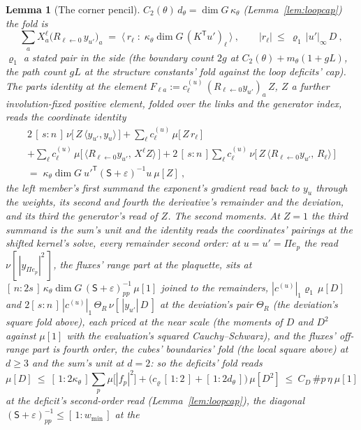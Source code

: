 \documentclass[11pt]{article}
\newtheorem{lemma}{Lemma}
\theoremstyle{definition}
\begin{document}
\begin{lemma}[The corner pencil]
$C_2(\theta)\,d_\theta=\dim G\,\kappa_\theta$ (Lemma~\ref{lem:loopcap})
the fold is
\[
\sum_aX^{\ell}_a\big(R_{\ell\leftarrow0}\,y_{u'}\big)_a
\;=\;\big\langle\,r_\ell\;:\;\kappa_\theta\dim G\,(K^{\mathsf T}u')_\ell\,\big\rangle\ ,
\qquad
|r_\ell|\ \le\ \varrho_1\,|u'|_\infty\,D\ ,
\]
$\varrho_1$ a stated pair in the side (the boundary count $2g$ at
$C_2(\theta)+m_\theta(1+gL)$, the path count $gL$ at the structure
constants' fold against the loop deficits' cap). The parts identity
at the element $F_{\ell a}:=c^{(u)}_\ell\,(R_{\ell\leftarrow0}y_{u'})_a\,Z$,
$Z$ a further involution-fixed positive element, folded over the links and
the generator index, reads the \emph{coordinate identity}
\begin{multline*}
2\,[\,s:n\,]\,\nu\big[\,Z\,\langle y_{u'},y_u\rangle\,\big]
+\sum_\ell c^{(u)}_\ell\,\mu\big[\,Z\,r_\ell\,\big]\\
+\sum_\ell c^{(u)}_\ell\,\mu\big[\,\langle R_{\ell\leftarrow0}y_{u'},\,X^{\ell}Z\rangle\,\big]
+2\,[\,s:n\,]\sum_\ell c^{(u)}_\ell\,
\nu\big[\,Z\,\langle R_{\ell\leftarrow0}y_{u'},\,R_\ell\rangle\,\big]\\
=\;\kappa_\theta\dim G\ u'^{\mathsf T}(\mathsf S+\varepsilon)^{-1}u\ \mu[Z]\ ,
\end{multline*}
the left member's first summand the exponent's gradient read back
to $y_u$ through the weights, its second and fourth the derivative's
remainder and the deviation, and its third the generator's read of
$Z$. \emph{The second moments.} At $Z=1$ the third summand is the
sum's unit and the identity reads the coordinates' pairings at the
shifted kernel's solve, every remainder second order: at
$u=u'=\Pi e_p$ the read $\nu[\,|y_{\Pi e_p}|^{2}\,]$, the fluxes'
range part at the plaquette, sits at
$[\,n:2s\,]\,\kappa_\theta\dim G\,(\mathsf S+\varepsilon)^{-1}_{pp}\,\mu[1]$
joined to the remainders, $|c^{(u)}|_1\varrho_1\,\mu[D]$ and
$2[\,s:n\,]\,|c^{(u)}|_1\,\Theta_R\,\nu[\,|y_{u'}|\,D\,]$ at the
deviation's pair $\Theta_R$ (the deviation's square fold above),
each priced at the near scale (the moments of $D$ and $D^{2}$
against $\mu[1]$ with the evaluation's squared Cauchy--Schwarz),
and the fluxes' off-range part is fourth order, the cubes'
boundaries' fold (the local square above) at $d\ge3$ and the sum's
unit at $d=2$: so the deficits' fold reads
\[
\mu[D]\ \le\ [\,1:2\kappa_\theta\,]\sum_p\mu\big[|f_p|^{2}\big]
+\big(c_\varrho\,[\,1:2\,]+[\,1:2d_\theta\,]\big)\,\mu[D^{2}]
\ \le\ C_D\,\#p\,\eta\ \mu[1]
\]
at the deficit's second-order read (Lemma~\ref{lem:loopcap}), the
diagonal $(\mathsf S+\varepsilon)^{-1}_{pp}\le[\,1:w_{\min}\,]$ at the

\end{lemma}
\end{document}
